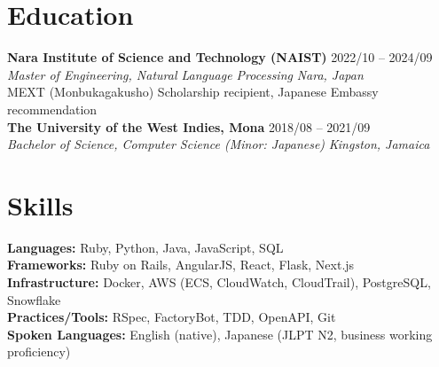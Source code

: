 \documentclass[10pt,letterpaper]{article}
\begin{document}
\section*{Education}
\textbf{Nara Institute of Science and Technology (NAIST)} \hfill 2022/10 -- 2024/09\\
\textit{Master of Engineering, Natural Language Processing} \hfill \textit{Nara, Japan}\\
MEXT (Monbukagakusho) Scholarship recipient, Japanese Embassy recommendation\\[0pt]
\textbf{The University of the West Indies, Mona} \hfill 2018/08 -- 2021/09\\
\textit{Bachelor of Science, Computer Science (Minor: Japanese)} \hfill \textit{Kingston, Jamaica}

\section*{Skills}
\textbf{Languages:} Ruby, Python, Java, JavaScript, SQL \\
\textbf{Frameworks:} Ruby on Rails, AngularJS, React, Flask, Next.js \\
\textbf{Infrastructure:} Docker, AWS (ECS, CloudWatch, CloudTrail), PostgreSQL, Snowflake \\
\textbf{Practices/Tools:} RSpec, FactoryBot, TDD, OpenAPI, Git \\
\textbf{Spoken Languages:} English (native), Japanese (JLPT N2, business working proficiency)
\end{document}
